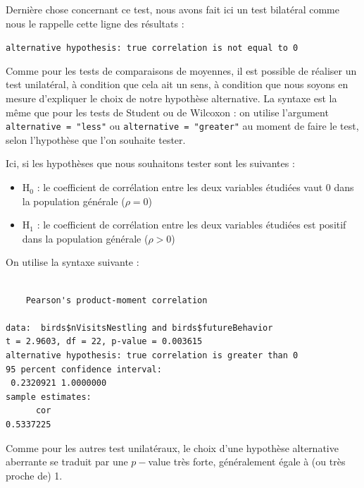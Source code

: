 \documentclass[a4paperpaper,]{article}
\newenvironment{Shaded}{\begin{snugshade}}{\end{snugshade}}
\newcommand{\DataTypeTok}[1]{\textcolor[rgb]{0.00,0.34,0.68}{#1}}
\newcommand{\KeywordTok}[1]{\textcolor[rgb]{0.12,0.11,0.11}{\textbf{#1}}}
\newcommand{\NormalTok}[1]{\textcolor[rgb]{0.12,0.11,0.11}{#1}}
\newcommand{\OperatorTok}[1]{\textcolor[rgb]{0.12,0.11,0.11}{#1}}
\newcommand{\StringTok}[1]{\textcolor[rgb]{0.75,0.01,0.01}{#1}}
\providecommand{\tightlist}{%
  \setlength{\itemsep}{0pt}\setlength{\parskip}{0pt}}
\begin{document}
Dernière chose concernant ce test, nous avons fait ici un test bilatéral comme nous le rappelle cette ligne des résultats :

\texttt{alternative\ hypothesis:\ true\ correlation\ is\ not\ equal\ to\ 0}

Comme pour les tests de comparaisons de moyennes, il est possible de réaliser un test unilatéral, à condition que cela ait un sens, à condition que nous soyons en mesure d'expliquer le choix de notre hypothèse alternative. La syntaxe est la même que pour les tests de Student ou de Wilcoxon : on utilise l'argument \texttt{alternative\ =\ "less"} ou \texttt{alternative\ =\ "greater"} au moment de faire le test, selon l'hypothèse que l'on souhaite tester.

Ici, si les hypothèses que nous souhaitons tester sont les suivantes :

\begin{itemize}
\tightlist
\item
  H\(_0\) : le coefficient de corrélation entre les deux variables étudiées vaut 0 dans la population générale (\(\rho = 0\))
\item
  H\(_1\) : le coefficient de corrélation entre les deux variables étudiées est positif dans la population générale (\(\rho > 0\))
\end{itemize}

On utilise la syntaxe suivante :

\begin{Shaded}
\end{Shaded}

\begin{verbatim}

    Pearson's product-moment correlation

data:  birds$nVisitsNestling and birds$futureBehavior
t = 2.9603, df = 22, p-value = 0.003615
alternative hypothesis: true correlation is greater than 0
95 percent confidence interval:
 0.2320921 1.0000000
sample estimates:
      cor 
0.5337225 
\end{verbatim}

Comme pour les autres test unilatéraux, le choix d'une hypothèse alternative aberrante se traduit par une \(p-\)value très forte, généralement égale à (ou très proche de) 1.
\end{document}
